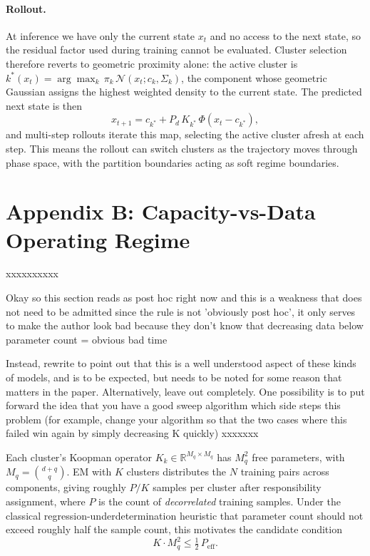\documentclass{article}
\begin{document}
\paragraph{Rollout.} At inference we have only the current state $x_t$ and no access 
to the next state, so the residual factor used during training cannot be evaluated. 
Cluster selection therefore reverts to geometric proximity alone: the active cluster is 
$k^*(x_t) = \arg\max_k\, \pi_k\, \mathcal{N}(x_t; c_k, \Sigma_k)$, the component 
whose geometric Gaussian assigns the highest weighted density to the current state. The 
predicted next state is then
\[
x_{t+1} = c_{k^*} + P_d\, K_{k^*}\, \Phi(x_t - c_{k^*}),
\]
and multi-step rollouts iterate this map, selecting the active cluster afresh at each 
step. This means the rollout can switch clusters as the trajectory moves through phase 
space, with the partition boundaries acting as soft regime boundaries.





\section*{Appendix B: Capacity-vs-Data Operating Regime}


xxxxxxxxxx

Okay so this section reads as post hoc right now and this is a weakness that does not need to be admitted since the rule is not 'obviously post hoc', it only serves to make the author look bad because they don't know that decreasing data below parameter count = obvious bad time

Instead, rewrite to point out that this is a well understood aspect of these kinds of models, and is to be expected, but needs to be noted for some reason that matters in the paper. Alternatively, leave out completely. One possibility is to put forward the idea that you have a good sweep algorithm which side steps this problem (for example, change your algorithm so that the two cases where this failed win again by simply decreasing K quickly)
xxxxxxx

Each cluster's Koopman operator $K_k \in \mathbb{R}^{M_q \times M_q}$ has $M_q^2$ free parameters, with $M_q = \binom{d+q}{q}$. EM with $K$ clusters distributes the $N$ training pairs across components, giving roughly $P/K$ samples per cluster after responsibility assignment, where $P$ is the count of \emph{decorrelated} training samples. Under the classical regression-underdetermination heuristic that parameter count should not exceed roughly half the sample count, this motivates the candidate condition
\[
K \cdot M_q^2 \le \tfrac{1}{2}\,P_{\text{eff}}.
\]
\end{document}
